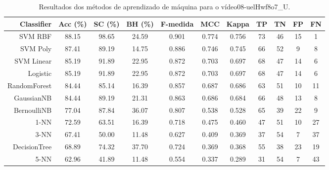 \begin{table}[!htb]
\centering
\caption{Resultados dos métodos de aprendizado de máquina para o vídeo08-uelHwf8o7_U.}
\label{tab:08-uelHwf8o7_U}
\begin{tabular}{r|c|c|c|c|c|c|c|c|c|c}
\hline\hline
Classifier & Acc (\%) & SC (\%) & BH (\%) & F-medida & MCC & Kappa & TP & TN & FP & FN \\ \hline
SVM RBF & 88.15 & 98.65 & 24.59 & 0.901 & 0.774 & 0.756 & 73 & 46 & 15 & 1 \\ 
SVM Poly & 87.41 & 89.19 & 14.75 & 0.886 & 0.746 & 0.745 & 66 & 52 & 9 & 8 \\ 
SVM Linear & 85.19 & 91.89 & 22.95 & 0.872 & 0.703 & 0.697 & 68 & 47 & 14 & 6 \\ 
Logistic & 85.19 & 91.89 & 22.95 & 0.872 & 0.703 & 0.697 & 68 & 47 & 14 & 6 \\ 
RandomForest & 84.44 & 85.14 & 16.39 & 0.857 & 0.687 & 0.686 & 63 & 51 & 10 & 11 \\ 
GaussianNB & 84.44 & 89.19 & 21.31 & 0.863 & 0.686 & 0.684 & 66 & 48 & 13 & 8 \\ 
BernoulliNB & 77.04 & 87.84 & 36.07 & 0.807 & 0.538 & 0.528 & 65 & 39 & 22 & 9 \\ 
1-NN & 72.59 & 63.51 & 16.39 & 0.718 & 0.475 & 0.460 & 47 & 51 & 10 & 27 \\ 
3-NN & 67.41 & 50.00 & 11.48 & 0.627 & 0.409 & 0.369 & 37 & 54 & 7 & 37 \\ 
DecisionTree & 68.89 & 74.32 & 37.70 & 0.724 & 0.369 & 0.368 & 55 & 38 & 23 & 19 \\ 
5-NN & 62.96 & 41.89 & 11.48 & 0.554 & 0.337 & 0.289 & 31 & 54 & 7 & 43 \\ 
\hline\hline
\end{tabular}
\end{table}
